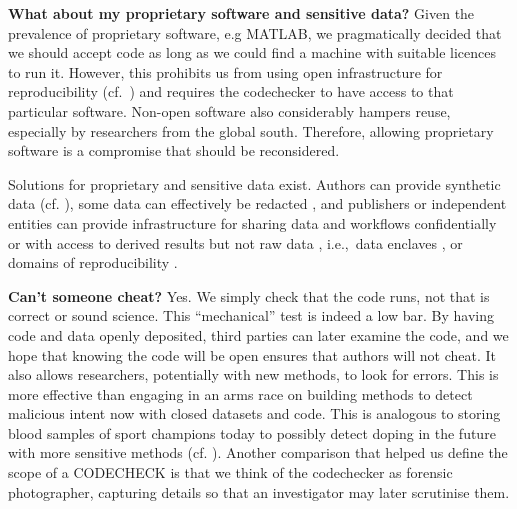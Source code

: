 \documentclass[12pt]{article}
\begin{document}
\textbf{What about my proprietary software and sensitive data?}  Given
the prevalence of proprietary software, e.g MATLAB, we pragmatically
decided that we should accept code as long as we could find a machine
with suitable licences to run it.  However, this prohibits us from
using open infrastructure for reproducibility
(cf.~\cite{konkol_publishing_2020,perkel_make_2019}) and requires the
codechecker to have access to that particular software.  Non-open
software also considerably hampers reuse, especially by researchers
from the global south. Therefore, allowing proprietary software is a
compromise that should be reconsidered.

Solutions for proprietary and sensitive data exist.  Authors can
provide synthetic data (cf. \cite{shannon_opening_2018}), some data
can effectively be redacted \cite{oloughlin_data_2015}, and publishers
or independent entities can provide infrastructure for sharing data
and workflows confidentially \cite{perignon_certify_2019} or with
access to derived results but not raw data
\cite{shannon_opening_2018}, i.e.,~data enclaves
\cite{foster_research_2018}, or domains of reproducibility
\cite{harris_more_2017}.

\textbf{Can't someone cheat?} Yes. We simply check that the code runs,
not that is correct or sound science. This ``mechanical'' test is
indeed a low bar.  By having code and data openly deposited, third
parties can later examine the code, and we hope that knowing the code
will be open ensures that authors will not cheat.  It also allows
researchers, potentially with new methods, to look for errors.  This
is more effective than engaging in an arms race on building methods to
detect malicious intent now with closed datasets and code.  This is
analogous to storing blood samples of sport champions today to
possibly detect doping in the future with more sensitive methods
(cf. \cite{everythinghertz97}).  Another comparison that helped us
define the scope of a CODECHECK is that we think of the codechecker as
forensic photographer, capturing details so that an investigator may
later scrutinise them.
\end{document}
